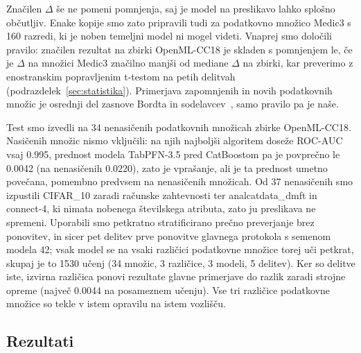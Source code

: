 \documentclass[a4paper,12pt,openright]{book}
\begin{document}
Značilen $\Delta$ še ne pomeni pomnjenja, saj je model na preslikavo lahko
splošno občutljiv. Enake kopije smo zato pripravili tudi za podatkovno množico
Medic3 s 160 razredi, ki je noben temeljni model ni mogel videti. Vnaprej smo
določili pravilo: značilen rezultat na zbirki OpenML-CC18 je skladen s
pomnjenjem le, če je $\Delta$ na množici Medic3 značilno manjši od mediane
$\Delta$ na zbirki, kar preverimo z enostranskim popravljenim t-testom na
petih delitvah (podrazdelek~\ref{sec:statistika}). Primerjava zapomnjenih in
novih podatkovnih množic je osrednji del zasnove Bordta in
sodelavcev~\cite{bordt2024elephants}, samo pravilo pa je naše.

Test smo izvedli na 34 nenasičenih podatkovnih množicah zbirke OpenML-CC18.
Nasičenih množic nismo vključili: na njih najboljši algoritem doseže ROC-AUC
vsaj \num{0.995}, prednost modela TabPFN-3.5 pred CatBoostom pa je povprečno
le \num{0.0042} (na nenasičenih \num{0.0220}), zato je vprašanje, ali je ta
prednost umetno povečana, pomembno predvsem na nenasičenih množicah.
Od 37 nenasičenih smo izpustili CIFAR\_10 zaradi računske zahtevnosti ter
analcatdata\_dmft in connect-4, ki nimata nobenega številskega atributa, zato
ju preslikava ne spremeni. Uporabili smo petkratno stratificirano prečno
preverjanje brez ponovitev, in sicer pet delitev prve ponovitve glavnega
protokola s semenom modela 42; vsak model se na vsaki različici podatkovne
množice torej uči petkrat, skupaj je to 1530 učenj (34 množic, 3 različice,
3 modeli, 5 delitev). Ker so delitve iste, izvirna različica ponovi rezultate
glavne primerjave do razlik zaradi strojne opreme (največ \num{0.0044} na
posameznem učenju).
Vse tri različice podatkovne množice so tekle v istem opravilu na istem vozlišču.

\subsection{Rezultati}
\end{document}
